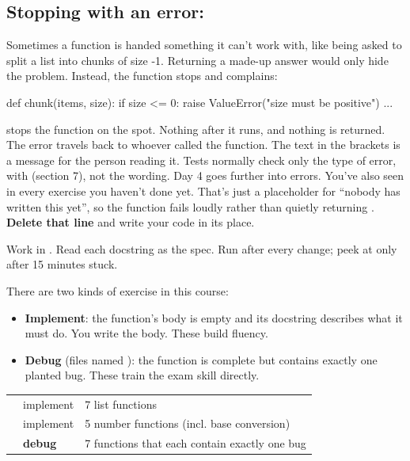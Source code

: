 \documentclass[10pt,a4paper]{article}
\begin{document}
\subsection{Stopping with an error: }
Sometimes a function is handed something it can’t work with, like being asked to split a list into chunks of size -1. Returning a made-up answer would only hide the problem. Instead, the function stops and complains:
\begin{pycode}
def chunk(items, size):
    if size <= 0:
        raise ValueError("size must be positive")
    ...
\end{pycode}
 stops the function on the spot. Nothing after it runs, and nothing is returned. The error travels back to whoever called the function. The text in the brackets is a message for the person reading it. Tests normally check only the type of error, with  (section 7), not the wording. Day 4 goes further into errors.
You’ve also seen  in every exercise you haven’t done yet. That’s just a placeholder for “nobody has written this yet”, so the function fails loudly rather than quietly returning . \textbf{Delete that line} and write your code in its place.
\begin{practicebox}
Work in . Read each docstring as the spec. Run  after every change; peek at  only after 15 minutes stuck.
\end{practicebox}
There are two kinds of exercise in this course:
\begin{itemize}
\item \textbf{Implement}: the function’s body is empty and its docstring describes what it must do. You write the body. These build fluency.
\item \textbf{Debug} (files named ): the function is complete but contains exactly one planted bug. These train the exam skill directly.
\end{itemize}
\begin{datatable}{}{\footnotesize}
\begin{xltabular}{\linewidth}{@{}Y{1.33}Y{0.58}Y{1.09}@{}}
 &  &  \\ \hline
\endhead
{} & implement & 7 list functions \\
 & implement & 5 number functions (incl. base conversion) \\
 & \textbf{debug} & 7 functions that each contain exactly one bug \\
\hline
\end{xltabular}
\end{datatable}
\end{document}
